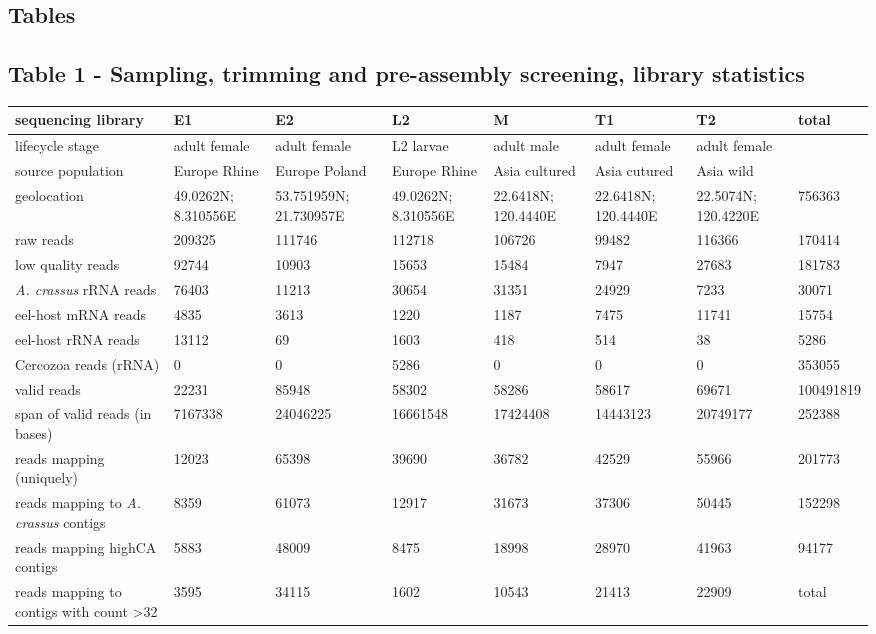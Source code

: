 \documentclass[10pt]{bmc_article}
\newenvironment{bmcformat}{\begin{raggedright}\baselineskip20pt\sloppy\setboolean{publ}{false}}{\end{raggedright}\baselineskip20pt\sloppy}
\begin{document}
\begin{bmcformat}
\newpage

\section*{Tables}
\subsection*{Table 1 - Sampling, trimming and pre-assembly screening,
  library statistics}


\begin{tabular}{p{3.5cm}p{1.5cm}p{1.5cm}p{1.5cm}p{1.5cm}p{1.5cm}p{1.5cm}p{1.5cm}}
   \hline
sequencing library & E1 & E2 & L2 & M & T1 & T2 & total \\ 
   \hline
lifecycle stage & adult female & adult female & L2 larvae & adult male & adult female & adult female &  \\ 
  source population & Europe Rhine & Europe Poland & Europe Rhine & Asia cultured & Asia cutured & Asia wild &  \\ 
  geolocation & 49.0262N; 8.310556E & 53.751959N; 21.730957E & 49.0262N; 8.310556E & 22.6418N; 120.4440E & 22.6418N; 120.4440E & 22.5074N; 120.4220E & 756363 \\ 
  raw reads & 209325 & 111746 & 112718 & 106726 &  99482 & 116366 & 170414 \\ 
  low quality reads & 92744 & 10903 & 15653 & 15484 &  7947 & 27683 & 181783 \\ 
  \textit{A. crassus} rRNA reads & 76403 & 11213 & 30654 & 31351 & 24929 &  7233 & 30071 \\ 
  eel-host mRNA reads &  4835 &  3613 &  1220 &  1187 &  7475 & 11741 & 15754 \\ 
  eel-host rRNA reads & 13112 &    69 &  1603 &   418 &   514 &    38 & 5286 \\ 
  Cercozoa reads (rRNA) &    0 &    0 & 5286 &    0 &    0 &    0 & 353055 \\ 
  valid reads & 22231 & 85948 & 58302 & 58286 & 58617 & 69671 & 100491819 \\ 
  span of valid reads (in bases) &  7167338 & 24046225 & 16661548 & 17424408 & 14443123 & 20749177 & 252388 \\ 
  reads mapping (uniquely) & 12023 & 65398 & 39690 & 36782 & 42529 & 55966 & 201773 \\ 
  reads mapping to \textit{A. crassus} contigs &  8359 & 61073 & 12917 & 31673 & 37306 & 50445 & 152298 \\ 
  reads mapping highCA contigs &  5883 & 48009 &  8475 & 18998 & 28970 & 41963 & 94177 \\ 
  reads mapping to contigs with count >32 &  3595 & 34115 &  1602 & 10543 & 21413 & 22909 & total \\ 
   \hline
\end{tabular}
\newpage


\end{bmcformat}
\end{document}
